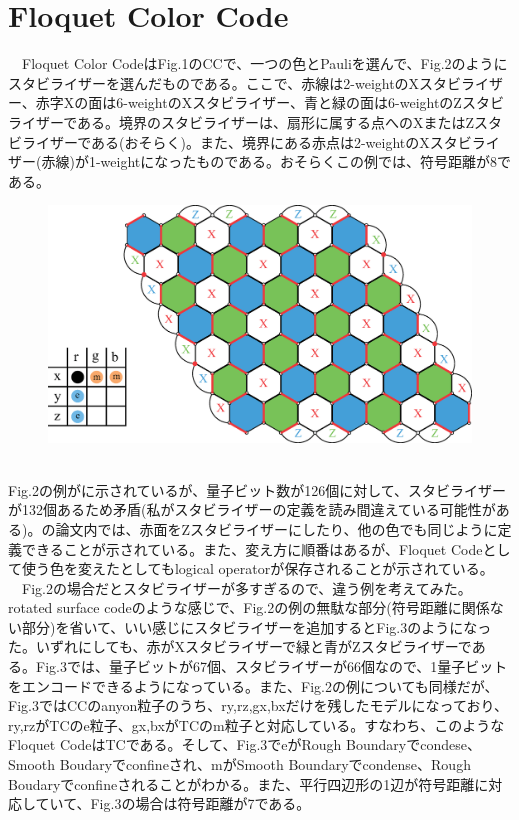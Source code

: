 \documentclass[a4paper,9pt]{ltjsarticle}
\begin{document}
\section{Floquet Color Code}
  　Floquet Color CodeはFig.1のCCで、一つの色とPauliを選んで、Fig.2のようにスタビライザーを選んだものである。ここで、赤線は2-weightのXスタビライザー、赤字Xの面は6-weightのXスタビライザー、青と緑の面は6-weightのZスタビライザーである。境界のスタビライザーは、扇形に属する点へのXまたはZスタビライザーである(おそらく)。また、境界にある赤点は2-weightのXスタビライザー(赤線)が1-weightになったものである。おそらくこの例では、符号距離が8である。
  \begin{figure}[h]
    \centering
    \includegraphics[scale=0.30]{figure/figure2.eps}
    \vspace{10pt}\caption{}
    \label{figure2}
    \vspace{-15pt}
  \end{figure}\\
  Fig.2の例が\cite{kesselring2024}に示されているが、量子ビット数が126個に対して、スタビライザーが132個あるため矛盾(私がスタビライザーの定義を読み間違えている可能性がある)。\cite{kesselring2024}の論文内では、赤面をZスタビライザーにしたり、他の色でも同じように定義できることが示されている。また、変え方に順番はあるが、Floquet Codeとして使う色を変えたとしてもlogical operatorが保存されることが示されている。\\
  　Fig.2の場合だとスタビライザーが多すぎるので、違う例を考えてみた。rotated surface codeのような感じで、Fig.2の例の無駄な部分(符号距離に関係ない部分)を省いて、いい感じにスタビライザーを追加するとFig.3のようになった。いずれにしても、赤がXスタビライザーで緑と青がZスタビライザーである。Fig.3では、量子ビットが67個、スタビライザーが66個なので、1量子ビットをエンコードできるようになっている。また、Fig.2の例についても同様だが、Fig.3ではCCのanyon粒子のうち、ry,rz,gx,bxだけを残したモデルになっており、ry,rzがTCのe粒子、gx,bxがTCのm粒子と対応している。すなわち、このようなFloquet CodeはTCである。そして、Fig.3でeがRough Boundaryでcondese、Smooth Boudaryでconfineされ、mがSmooth Boundaryでcondense、Rough Boudaryでconfineされることがわかる。また、平行四辺形の1辺が符号距離に対応していて、Fig.3の場合は符号距離が7である。
\end{document}
